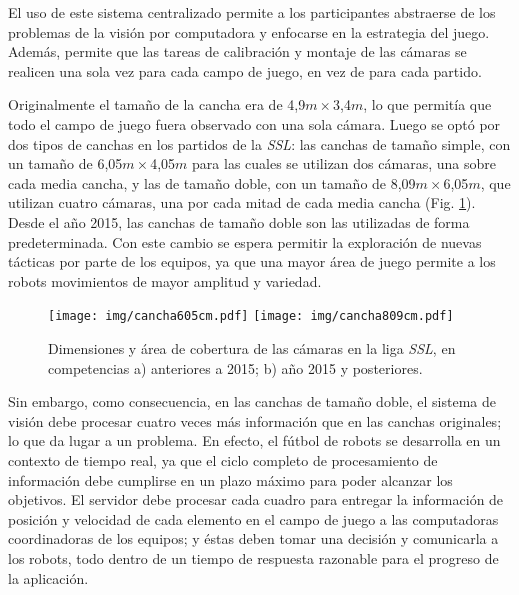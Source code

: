 El uso de este sistema centralizado permite a los participantes abstraerse de
los problemas de la visión por computadora y enfocarse en la estrategia del
juego. Además, permite que las tareas de calibración y montaje de las cámaras se
realicen una sola vez para cada campo de juego, en vez de para cada partido.

Originalmente el tamaño de la cancha era de 4,9$m\times$3,4$m$, lo que permitía
que todo el campo de juego fuera observado con una sola cámara. Luego se optó
por dos tipos de canchas en los partidos de la \emph{SSL}: las canchas de tamaño
simple, con un tamaño de 6,05$m\times$4,05$m$ para las cuales se utilizan dos
cámaras, una sobre cada media cancha, y las de tamaño doble, con un tamaño de
8,09$m\times$6,05$m$, que utilizan cuatro cámaras, una por cada mitad de cada
media cancha (Fig. \ref{cancha}). Desde el año 2015, las canchas de tamaño doble
son las utilizadas de forma predeterminada\cite{sslrules2015}. Con este cambio
se espera permitir la exploración de nuevas tácticas por parte de los equipos,
ya que una mayor área de juego permite a los robots movimientos de mayor
amplitud y variedad.

\begin{figure}[!h]

	\centering

	\texttt{[image: img/cancha605cm.pdf]}
	\texttt{[image: img/cancha809cm.pdf]}

	\caption{Dimensiones y área de cobertura de las cámaras en la liga
	\emph{SSL}, en competencias a) anteriores a 2015; b) año 2015 y
	posteriores.}

	\label{cancha}

\end{figure}

Sin embargo, como consecuencia, en las canchas de tamaño doble, el sistema de
visión debe procesar cuatro veces más información que en las canchas originales;
lo que da lugar a un problema. En efecto, el fútbol de robots se desarrolla en
un contexto de tiempo real, ya que el ciclo completo de procesamiento de
información debe cumplirse en un plazo máximo para poder alcanzar los objetivos.
El servidor debe procesar cada cuadro para entregar la información de posición y
velocidad de cada elemento en el campo de juego a las computadoras coordinadoras
de los equipos; y éstas deben tomar una decisión y comunicarla a los robots,
todo dentro de un tiempo de respuesta razonable para el progreso de la
aplicación.

